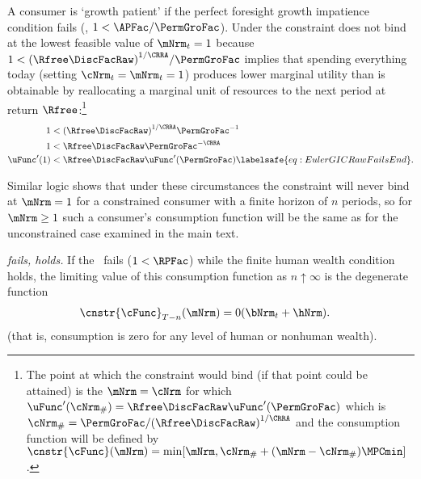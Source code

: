 \documentclass[\econtexRoot/BufferStockTheory]{subfiles}
\begin{document}
A consumer is `growth patient' if the perfect foresight growth
impatience condition fails (\cncl{\GICRaw}, $1 < \APFac/\PermGroFac$).
Under
\cncl{\GICRaw} the constraint does not bind at the lowest feasible value of $\mNrm_{t}=1$ because
$1 < {(\Rfree\DiscFacRaw)}^{1/\CRRA}/\PermGroFac$ implies that spending
everything today (setting $\cNrm_{t}=\mNrm_{t}=1$) produces lower
marginal utility than is obtainable by reallocating a marginal unit of
resources to the next period at return $\Rfree$:\footnote{The point at
  which the constraint would bind (if that point could be attained) is
  the $\mNrm=\cNrm$ for which $\uFunc^{\prime}(\cNrm_{\#}) = \Rfree
  \DiscFacRaw \uFunc^{\prime}(\PermGroFac)$ which is $\cNrm_{\#} =
  \PermGroFac/{(\Rfree \DiscFacRaw)}^{1/\CRRA}$ and the consumption function
  will be defined by
  $\cnstr{\cFunc}(\mNrm)=\min[\mNrm,\cNrm_{\#}+(\mNrm-\cNrm_{\#})\MPCmin
  ]$.}
\begin{equation}\begin{gathered}\begin{aligned}
  1  & < {(\Rfree \DiscFacRaw)}^{1/\CRRA}\PermGroFac^{-1}    \notag
  \\ 1  & < \Rfree \DiscFacRaw \PermGroFac^{-\CRRA} \notag
  \\  \uFunc^{\prime}(1)  & < \Rfree \DiscFacRaw \uFunc^{\prime}(\PermGroFac)   \labelsafe{eq:EulerGICRawFailsEnd}.
\end{aligned}\end{gathered}\end{equation}

Similar logic shows that under these circumstances the constraint will never bind at $\mNrm=1$ for a constrained consumer with a finite horizon of $n$ periods, so for $\mNrm \geq 1$ such a consumer's consumption function will be the same as for the unconstrained case examined in the main text.

\hypertarget{cnclGICRawcnclRICFHWC}{}

\textit{{\RIC} fails, {\FHWC} holds.} If the \RIC~fails ($1 < \RPFac$) while the finite human wealth condition
holds, the limiting value of this consumption function as $n \uparrow
\infty$ is the degenerate function
\begin{equation}\begin{gathered}\begin{aligned}
  \cnstr{\cFunc}_{T-n}(\mNrm)  & = 0 (\bNrm_{t}+\hNrm).
\end{aligned}\end{gathered}\end{equation}
(that is, consumption is zero for any level of human or nonhuman wealth).
\end{document}
